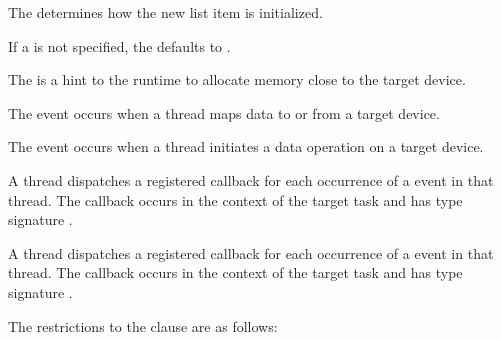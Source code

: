 The  determines how the new list item is initialized.

If a  is not specified, the  defaults to .

The   is a hint to the runtime to 
allocate memory close to the target device.

\events
The  event occurs when a thread maps data to or from a target device.

The  event occurs when a thread initiates a data operation 
on a target device.

\tools

A thread dispatches a registered 
callback for each occurrence of a  event in that thread.
The callback occurs in the context of the target task and has type signature 
.

A thread dispatches a registered 
callback for each occurrence of a  event in that thread.
The callback occurs in the context of the target task and has type signature 
.

\restrictions
The restrictions to the  clause are as follows:

